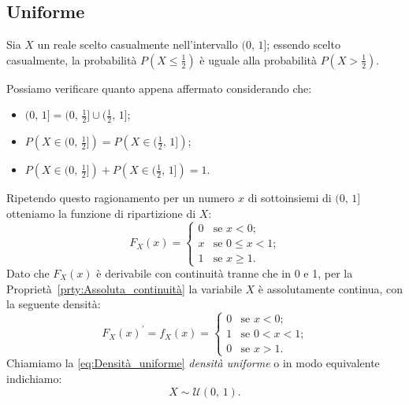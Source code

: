         \subsection{Uniforme}
            \begin{defn}\label{defn:Densità_uniforme}
                Sia $X$ un reale scelto casualmente nell'intervallo $(0,\,1]$; essendo scelto casualmente, la probabilità $P(X \leq \frac{1}{2})$ è uguale alla probabilità $P(X > \frac{1}{2})$.

                Possiamo verificare quanto appena affermato considerando che:
                \begin{itemize}
                    \item $(0,\,1] = (0,\,\frac{1}{2}] \cup (\frac{1}{2},\,1]$;
                    \item $P\left(X \in (0,\,\frac{1}{2}]\right) = P\left(X \in (\frac{1}{2},\,1]\right)$;
                    \item $P\left(X \in (0,\,\frac{1}{2}]\right) + P\left(X \in (\frac{1}{2},\,1]\right) = 1$.
                \end{itemize}
                Ripetendo questo ragionamento per un numero $x$ di sottoinsiemi di $(0,\,1]$ otteniamo la funzione di ripartizione di $X$: \[
                    F_X(x) = \begin{cases}
                        0 & \text{se $x < 0$;} \\
                        x & \text{se $0 \leq x < 1$;} \\
                        1 & \text{se $x \geq 1$.}
                    \end{cases}
                \] Dato che $F_X(x)$ è derivabile con continuità tranne che in 0 e 1, per la Proprietà~\ref{prty:Assoluta_continuità} la variabile $X$ è assolutamente continua, con la seguente densità:
                \begin{equation}\label{eq:Densità_uniforme} 
                    F_X(x)^{\prime} = f_X(x) = \begin{cases}
                        0 & \text{se $x < 0$;} \\
                        1 & \text{se $0 < x < 1$;} \\
                        0 & \text{se $x > 1$.}
                    \end{cases}
                \end{equation}
                Chiamiamo la \eqref{eq:Densità_uniforme} \emph{densità uniforme} o in modo equivalente indichiamo: \[
                    X \sim \mathcal{U}(0,\, 1)
                .\]
            \end{defn}
